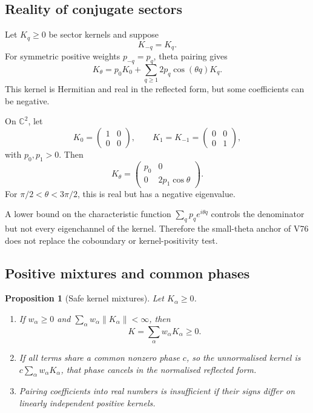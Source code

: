 \documentclass[11pt]{article}
\newtheorem{proposition}[theorem]{Proposition}
\begin{document}
\subsection{Reality of conjugate sectors}

Let \(K_q\ge0\) be sector kernels and suppose
\[
                              K_{-q}=K_q.                    \tag{98.10}
\]
For symmetric positive weights \(p_{-q}=p_q\), theta pairing gives
\[
 K_\theta
 =p_0K_0+\sum_{q\ge1}2p_q\cos(\theta q)K_q.                 \tag{98.11}
\]
This kernel is Hermitian and real in the reflected form, but some
coefficients can be negative.

\begin{counterexample}
\label{cnt:v11v98-pairing}
On \(\mathbb C^2\), let
\[
 K_0=\begin{pmatrix}1&0\\0&0\end{pmatrix},\qquad
 K_1=K_{-1}=\begin{pmatrix}0&0\\0&1\end{pmatrix},            \tag{98.12}
\]
with \(p_0,p_1>0\).  Then
\[
 K_\theta=
 \begin{pmatrix}p_0&0\\0&2p_1\cos\theta\end{pmatrix}.        \tag{98.13}
\]
For \(\pi/2<\theta<3\pi/2\), this is real but has a negative
eigenvalue.
\end{counterexample}

A lower bound on the characteristic function
\(\sum_qp_qe^{i\theta q}\) controls the denominator but not every
eigenchannel of the kernel.  Therefore the small-theta anchor of V76
does not replace the coboundary or kernel-positivity test.

\subsection{Positive mixtures and common phases}

\begin{proposition}[Safe kernel mixtures]
\label{prop:v11v98-mixture}
Let \(K_\alpha\ge0\).
\begin{enumerate}
\item If \(w_\alpha\ge0\) and
      \(\sum_\alpha w_\alpha\|K_\alpha\|<\infty\), then
\[
                              K=\sum_\alpha w_\alpha K_\alpha\ge0.
                                                                    \tag{98.14}
\]
\item If all terms share a common nonzero phase \(c\),
      so the unnormalised kernel is
      \(c\sum_\alpha w_\alpha K_\alpha\), that phase cancels in the
      normalised reflected form.
\item Pairing coefficients into real numbers is insufficient if their
      signs differ on linearly independent positive kernels.
\end{enumerate}
\end{proposition}
\end{document}
